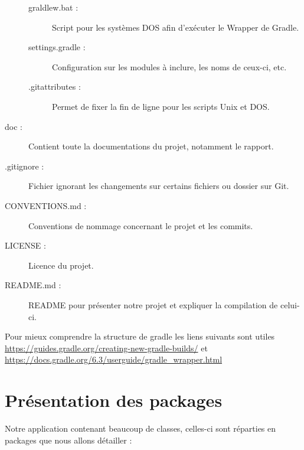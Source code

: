 \begin{description}
\begin{description}
				\item[graldlew.bat :]{Script pour les systèmes DOS afin d'exécuter le Wrapper de Gradle.}
				\item[settings.gradle :]{Configuration sur les modules à inclure, les noms de ceux-ci, etc.}
				\item[.gitattributes :]{Permet de fixer la fin de ligne pour les scripts Unix et DOS.}
			\end{description}
			\item[doc :]{Contient toute la documentations du projet, notamment le rapport.}
			\item[.gitignore :]{Fichier ignorant les changements sur certains fichiers ou dossier sur Git.}
			\item[CONVENTIONS.md :]{Conventions de nommage concernant le projet et les commits.}
			\item[LICENSE :]{Licence du projet.}
			\item[README.md :]{README pour présenter notre projet et expliquer la compilation de celui-ci.}
		\end{description}

		Pour mieux comprendre la structure de gradle les liens suivants sont utiles \url{https://guides.gradle.org/creating-new-gradle-builds/} et \url{https://docs.gradle.org/6.3/userguide/gradle_wrapper.html}

	\section{Présentation des packages}

		Notre application contenant beaucoup de classes, celles-ci sont réparties en packages que nous allons détailler :

